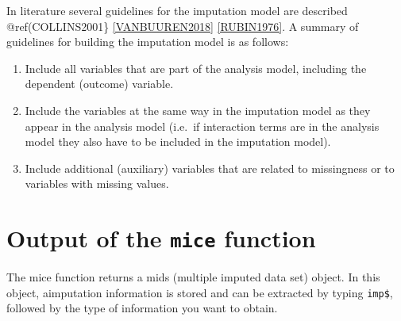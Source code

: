\documentclass[]{book}
\newenvironment{Shaded}{\begin{snugshade}}{\end{snugshade}}
\newcommand{\KeywordTok}[1]{\textcolor[rgb]{0.13,0.29,0.53}{\textbf{#1}}}
\newcommand{\DataTypeTok}[1]{\textcolor[rgb]{0.13,0.29,0.53}{#1}}
\newcommand{\DecValTok}[1]{\textcolor[rgb]{0.00,0.00,0.81}{#1}}
\newcommand{\StringTok}[1]{\textcolor[rgb]{0.31,0.60,0.02}{#1}}
\newcommand{\OperatorTok}[1]{\textcolor[rgb]{0.81,0.36,0.00}{\textbf{#1}}}
\newcommand{\NormalTok}[1]{#1}
\providecommand{\tightlist}{%
  \setlength{\itemsep}{0pt}\setlength{\parskip}{0pt}}
\begin{document}
\begin{Shaded}
\end{Shaded}

In literature several guidelines for the imputation model are described
@ref(COLLINS2001\} \ref{VANBUUREN2018} \ref{RUBIN1976}. A summary of
guidelines for building the imputation model is as follows:

\begin{enumerate}
\def\labelenumi{\arabic{enumi}.}
\tightlist
\item
  Include all variables that are part of the analysis model, including
  the dependent (outcome) variable.
\item
  Include the variables at the same way in the imputation model as they
  appear in the analysis model (i.e.~if interaction terms are in the
  analysis model they also have to be included in the imputation model).
\item
  Include additional (auxiliary) variables that are related to
  missingness or to variables with missing values.
\end{enumerate}

\section{\texorpdfstring{Output of the \texttt{mice}
function}{Output of the mice function}}\label{output-of-the-mice-function}

The mice function returns a mids (multiple imputed data set) object. In
this object, aimputation information is stored and can be extracted by
typing \texttt{imp\$}, followed by the type of information you want to
obtain.

\begin{Shaded}
\end{Shaded}
\end{document}
